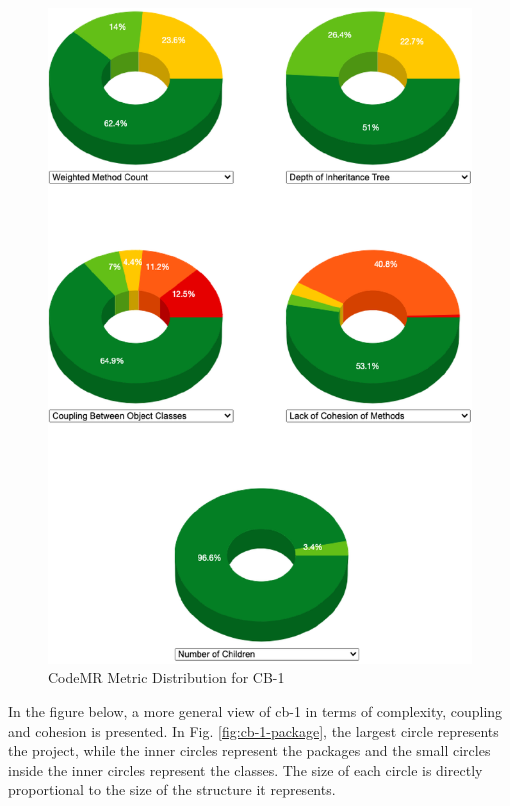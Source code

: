 \begin{figure}[ht!]
    \centering
    \includegraphics[scale=1]{figures/cb-1-donuts.png}
    \caption{CodeMR Metric Distribution for CB-1}
    \label{fig:cb-1-donuts}
\end{figure}
\FloatBarrier

In the figure below, a more general view of cb-1 in terms of complexity, coupling and cohesion is presented. In Fig. \ref{fig:cb-1-package}, the largest circle represents the project, while the inner circles represent the packages and the small circles inside the inner circles represent the classes. The size of each circle is directly proportional to the size of the structure it represents.

